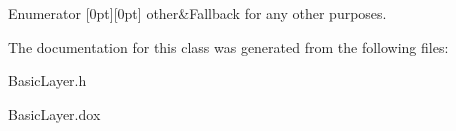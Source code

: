 \begin{DoxyEnumFields}{Enumerator}
[0pt][0pt]{}\mbox{\label{classHurricane_1_1BasicLayer_1_1Material_a3e815440ad4b86b3569fa54ca06fc3e8a43faff93bcb2788ccb23905cc0d07bec}} 
other&Fallback for any other purposes. \\
\hline

\end{DoxyEnumFields}


The documentation for this class was generated from the following files\+:\begin{DoxyCompactItemize}
\item 
Basic\+Layer.\+h\item 
Basic\+Layer.\+dox\end{DoxyCompactItemize}
